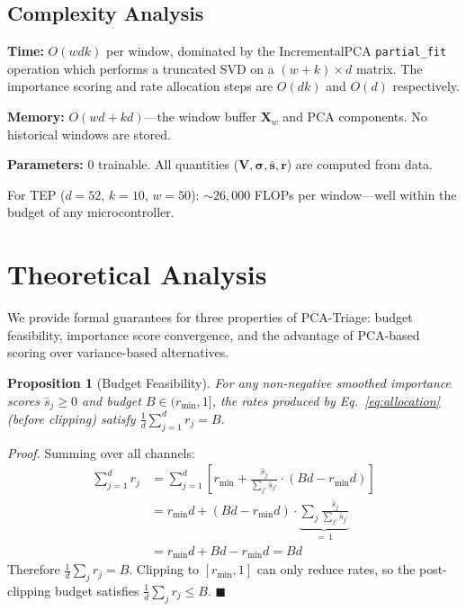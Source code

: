 \documentclass[journal]{IEEEtran}
\newtheorem{proposition}{Proposition}
\renewenvironment{proof}[1][Proof]{\noindent\textit{#1.}\space}{\hfill$\blacksquare$\par\medskip}
\begin{document}
\subsection{Complexity Analysis}

\textbf{Time:} $O(wdk)$ per window, dominated by the IncrementalPCA \texttt{partial\_fit} operation which performs a truncated SVD on a $(w+k) \times d$ matrix. The importance scoring and rate allocation steps are $O(dk)$ and $O(d)$ respectively.

\textbf{Memory:} $O(wd + kd)$---the window buffer $\mathbf{X}_w$ and PCA components. No historical windows are stored.

\textbf{Parameters:} 0 trainable. All quantities ($\mathbf{V}, \boldsymbol{\sigma}, \bar{\mathbf{s}}, \mathbf{r}$) are computed from data.

For TEP ($d{=}52$, $k{=}10$, $w{=}50$): ${\sim}26{,}000$ FLOPs per window---well within the budget of any microcontroller.

\section{Theoretical Analysis}
\label{sec:theory}

We provide formal guarantees for three properties of PCA-Triage: budget feasibility, importance score convergence, and the advantage of PCA-based scoring over variance-based alternatives.

\begin{proposition}[Budget Feasibility]
\label{prop:budget}
For any non-negative smoothed importance scores $\bar{s}_j \geq 0$ and budget $B \in (r_{\min}, 1]$, the rates produced by Eq.~\ref{eq:allocation} (before clipping) satisfy $\frac{1}{d}\sum_{j=1}^d r_j = B$.
\end{proposition}

\begin{proof}
Summing over all channels:
\begin{align}
\sum_{j=1}^d r_j &= \sum_{j=1}^d \left[ r_{\min} + \frac{\bar{s}_j}{\sum_{j'} \bar{s}_{j'}} \cdot (Bd - r_{\min} d) \right] \nonumber \\
&= r_{\min} d + (Bd - r_{\min} d) \cdot \underbrace{\sum_j \frac{\bar{s}_j}{\sum_{j'} \bar{s}_{j'}}}_{=\,1} \nonumber \\
&= r_{\min} d + Bd - r_{\min} d = Bd
\end{align}
Therefore $\frac{1}{d}\sum_j r_j = B$. Clipping to $[r_{\min}, 1]$ can only reduce rates, so the post-clipping budget satisfies $\frac{1}{d}\sum_j r_j \leq B$.
\end{proof}
\end{document}
